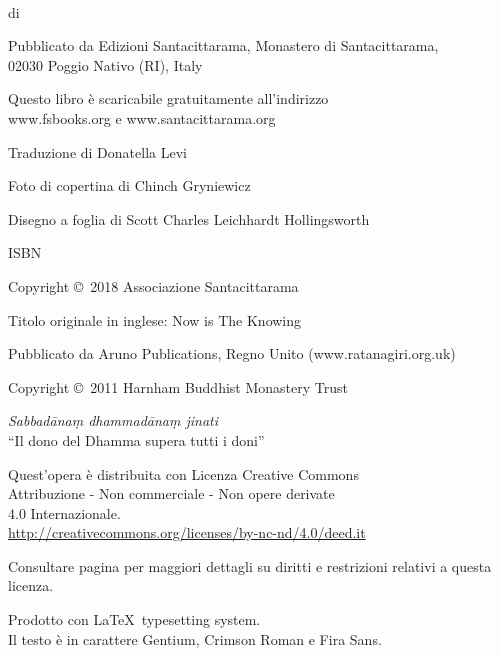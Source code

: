 \cleartoverso
\thispagestyle{empty}

{\copyrightsize
\centering
\setlength{\parindent}{0pt}%
\setlength{\parskip}{0.8\baselineskip}%

\thetitle\\
di \theauthor

Pubblicato da Edizioni Santacittarama, Monastero di Santacittarama,\\
02030 Poggio Nativo (RI), Italy

Questo libro è scaricabile gratuitamente all'indirizzo\\
www.fsbooks.org e www.santacittarama.org

Traduzione di Donatella Levi

Foto di copertina di Chinch Gryniewicz

Disegno a foglia di Scott Charles Leichhardt Hollingsworth

ISBN \theISBN

Copyright \copyright\ 2018 Associazione Santacittarama

Titolo originale in inglese: Now is The Knowing

Pubblicato da Aruno Publications, Regno Unito (www.ratanagiri.org.uk)

Copyright \copyright\ 2011 Harnham Buddhist Monastery Trust

\emph{Sabbadānaṃ dhammadānaṃ jinati}\\
``Il dono del Dhamma supera tutti i doni''

\vfill

{\footnotesize
Quest'opera è distribuita con Licenza Creative Commons\\
Attribuzione - Non commerciale - Non opere derivate\\
4.0 Internazionale.\\
\href{http://creativecommons.org/licenses/by-nc-nd/4.0/deed.it}{http://creativecommons.org/licenses/by-nc-nd/4.0/deed.it}

Consultare pagina \pageref{copyright-details} per maggiori dettagli su diritti e restrizioni relativi a questa licenza.

Prodotto con \LaTeX\ typesetting system.\\
Il testo è in carattere Gentium, Crimson Roman e Fira Sans.

\theEditionInfo

}}
